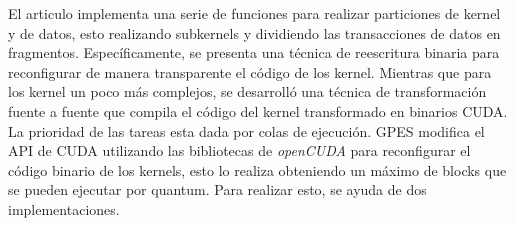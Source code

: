 
El articulo \cite{GPES} implementa una serie de funciones para realizar particiones de kernel y de datos, esto realizando subkernels y dividiendo las transacciones de datos en fragmentos. 
Específicamente, se presenta una técnica de reescritura binaria para reconfigurar de manera transparente el código de los kernel. Mientras que para los kernel un poco más complejos, se desarrolló una técnica de transformación fuente a fuente que compila el código del kernel transformado en binarios CUDA. La prioridad de las tareas esta dada por colas de ejecución. GPES modifica el API de CUDA utilizando las bibliotecas de  \textit{openCUDA} para reconfigurar el código binario de los kernels, esto lo realiza obteniendo un máximo de blocks que se pueden ejecutar por quantum. Para realizar esto, se ayuda de dos implementaciones.

